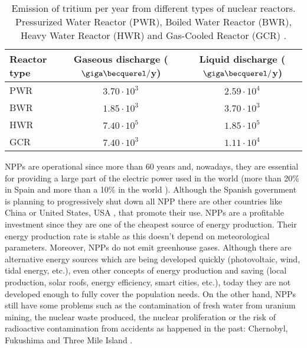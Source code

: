 \begin{table}[htbp]
\centering{}%
\begin{tabular}{lcc}
\toprule 
Reactor type & Gaseous discharge ($\giga\becquerel/$y) & Liquid discharge ($\giga\becquerel/$y)\tabularnewline
\midrule
\midrule 
PWR & $3.70\cdot 10^{3}$ & $2.59\cdot 10^{4}$ \tabularnewline
BWR & $1.85\cdot 10^{3}$ & $3.70\cdot 10^{3}$ \tabularnewline
HWR & $7.40\cdot 10^{5}$ & $1.85\cdot 10^{5}$ \tabularnewline
GCR & $7.40\cdot 10^{3}$ & $1.11\cdot 10^{4}$ \tabularnewline
\bottomrule
\end{tabular}
\caption{Emission of tritium per year from different types of nuclear reactors. Pressurized Water Reactor (PWR), Boiled Water Reactor (BWR), Heavy Water Reactor (HWR) and Gas-Cooled Reactor (GCR) \cite{CommonEmissionTritium}.}
\label{tab:TritiumEmisionsNPPs}
\end{table}

NPPs are operational since more than 60 years and, nowadays, they are essential for providing a large part of the electric power used in the world (more than 20\% in Spain \cite{PercentageEnergySpain} and more than a 10\% in the world \cite{PercentageEnergyWorld}). Although the Spanish government is planning to progressively shut down all NPP there are other countries like China \cite{60ReactorsChina} or United States, USA \cite{35MillionsUSA}, that promote their use. NPPs are a profitable investment since they are one of the cheapest source of energy production. Their energy production rate is stable as this doesn't depend on meteorological parameters. Moreover, NPPs do not emit greenhouse gases. Although there are alternative energy sources which are being developed quickly (photovoltaic, wind, tidal energy, etc.), even other concepts of energy production and saving (local production, solar roofs, energy efficiency, smart cities, etc.), today they are not developed enough to fully cover the population needs. On the other hand, NPPs still have some problems such as the contamination of fresh water from uranium mining, the nuclear waste produced, the nuclear proliferation or the risk of radioactive contamination from accidents as happened in the past: Chernobyl, Fukushima and Three Mile Island \cite{ThreeMileIsland}.

